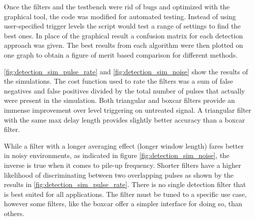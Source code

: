 Once the filters and the testbench were rid of bugs and optimized 
with the graphical tool, the code was modified for automated testing.
Instead of using user-specified trigger levels the script would 
test a range of settings to find the best ones. In place of the graphical
result a confusion matrix for each detection approach was given.
The best results from each algorithm were then plotted on
one graph to obtain a figure of merit based comparison for 
different methods.


\autoref{fig:detection_sim_pulse_rate} and \autoref{fig:detection_sim_noise}
show the results of the simulations. The cost function used to rate the 
filters was a sum of false negatives and false positives divided by the 
total number of pulses that actually were present in the simulation.
Both triangular and boxcar filters provide an immense improvement over
level triggering on untreated signal. A triangular filter
with the same max delay length provides slightly better accuracy 
than a boxcar filter.


While a filter with a longer averaging effect (longer window length) 
fares better in noisy environments, as indicated in figure
\autoref{fig:detection_sim_noise}, the inverse is true when 
it comes to pile-up frequency. Shorter filters have a higher likelihood
of discriminating between two overlapping pulses as shown 
by the results in \autoref{fig:detection_sim_pulse_rate}.
There is no single detection filter that is best suited for all applications.
The filter must be tuned to a specific use case, however
some filters, like the boxcar offer a simpler interface for
doing so, than others.

